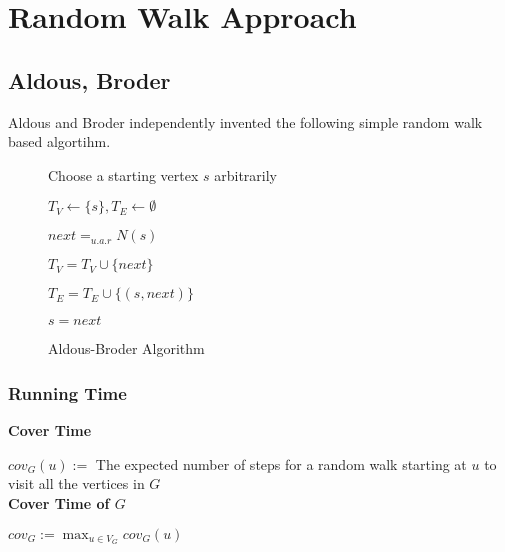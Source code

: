 
\chapter{Random Walk Approach} %

\label{Chapter3} %

\section{Aldous, Broder}

Aldous \cite{aldous1990random} and Broder \cite{63516} independently invented the following simple random walk based algortihm.


\begin{figure}[h!]
  \begin{algorithm}[H]
    
    Choose a starting vertex $s$ arbitrarily
    
    $T_V \leftarrow \{s\}, T_E \leftarrow \emptyset$
    
     {
      
      $next =_{u.a.r} N(s)$
      
       {
        $T_V = T_V \cup \{next\}$
        
        $T_E = T_E \cup \{(s, next)\}$
      }
      
      $s = next$
      
    }
    

    
    \caption{Aldous-Broder Algorithm}
  \end{algorithm}
\end{figure} 

\subsection{Running Time}


\textbf{Cover Time}

$cov_G(u) := $ The expected number of steps for a random walk starting at $u$ to visit all the vertices in $G$ \\


\textbf{Cover Time of $G$} 

$cov_G := \max_{u \in V_G} cov_G(u)$  


